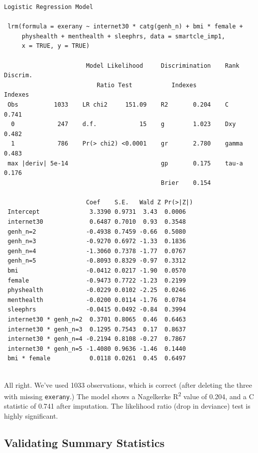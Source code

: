 \documentclass[]{book}
\theoremstyle{definition}
\theoremstyle{definition}
\theoremstyle{definition}
\theoremstyle{remark}
\begin{document}
\begin{verbatim}
Logistic Regression Model
 
 lrm(formula = exerany ~ internet30 * catg(genh_n) + bmi * female + 
     physhealth + menthealth + sleephrs, data = smartcle_imp1, 
     x = TRUE, y = TRUE)
 
                       Model Likelihood     Discrimination    Rank Discrim.    
                          Ratio Test           Indexes           Indexes       
 Obs          1033    LR chi2     151.09    R2       0.204    C       0.741    
  0            247    d.f.            15    g        1.023    Dxy     0.482    
  1            786    Pr(> chi2) <0.0001    gr       2.780    gamma   0.483    
 max |deriv| 5e-14                          gp       0.175    tau-a   0.176    
                                            Brier    0.154                     
 
                       Coef    S.E.   Wald Z Pr(>|Z|)
 Intercept              3.3390 0.9731  3.43  0.0006  
 internet30             0.6487 0.7010  0.93  0.3548  
 genh_n=2              -0.4938 0.7459 -0.66  0.5080  
 genh_n=3              -0.9270 0.6972 -1.33  0.1836  
 genh_n=4              -1.3060 0.7378 -1.77  0.0767  
 genh_n=5              -0.8093 0.8329 -0.97  0.3312  
 bmi                   -0.0412 0.0217 -1.90  0.0570  
 female                -0.9473 0.7722 -1.23  0.2199  
 physhealth            -0.0229 0.0102 -2.25  0.0246  
 menthealth            -0.0200 0.0114 -1.76  0.0784  
 sleephrs              -0.0415 0.0492 -0.84  0.3994  
 internet30 * genh_n=2  0.3701 0.8065  0.46  0.6463  
 internet30 * genh_n=3  0.1295 0.7543  0.17  0.8637  
 internet30 * genh_n=4 -0.2194 0.8108 -0.27  0.7867  
 internet30 * genh_n=5 -1.4080 0.9636 -1.46  0.1440  
 bmi * female           0.0118 0.0261  0.45  0.6497  
 
\end{verbatim}

All right. We've used 1033 observations, which is correct (after
deleting the three with missing \texttt{exerany}.) The model shows a
Nagelkerke R\textsuperscript{2} value of 0.204, and a C statistic of
0.741 after imputation. The likelihood ratio (drop in deviance) test is
highly significant.

\subsection{Validating Summary
Statistics}\label{validating-summary-statistics}
\end{document}
